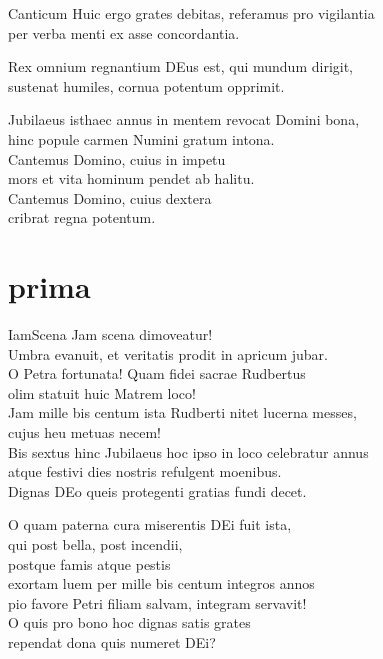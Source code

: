 \documentclass[tocstyle=ref-genre]{ees}
\begin{document}
{\begin{movement}{Canticum}
  Huic ergo grates debitas, referamus pro vigilantia\\
  per verba menti ex asse concordantia.

  Rex omnium regnantium DEus est, qui mundum dirigit,\\
  sustenat humiles, cornua potentum opprimit.

  \voice[Coro]
  Jubilaeus isthaec annus in mentem revocat Domini bona,\\
  hinc popule carmen Numini gratum intona.\\
  Cantemus Domino, cuius in impetu\\
  mors et vita hominum pendet ab halitu.\\
  Cantemus Domino, cuius dextera\\
  cribrat regna potentum.
\end{movement}

\part{prima}

\begin{movement}{IamScena}
  Jam scena dimoveatur!\\
  Umbra evanuit, et veritatis prodit in apricum jubar.\\
  O Petra fortunata! Quam fidei sacrae Rudbertus\\
  olim statuit huic Matrem loco!\\
  Jam mille bis centum ista Rudberti nitet lucerna messes,\\
  cujus heu metuas necem!\\
  Bis sextus hinc Jubilaeus hoc ipso in loco celebratur annus\\
  atque festivi dies nostris refulgent moenibus.\\
  Dignas DEo queis protegenti gratias fundi decet.

  O quam paterna cura miserentis DEi fuit ista,\\
  qui post bella, post incendii,\\
  postque famis atque pestis\\
  exortam luem per mille bis centum integros annos\\
  pio favore Petri filiam salvam, integram servavit!\\
  O quis pro bono hoc dignas satis grates\\
  rependat dona quis numeret DEi?


\end{movement}}
\end{document}
